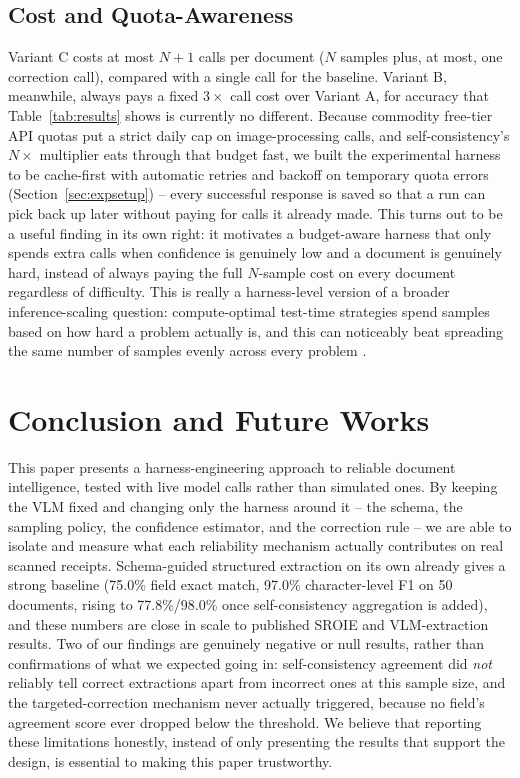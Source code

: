 \documentclass[conference]{IEEEtran}
\begin{document}
\subsection{Cost and Quota-Awareness}
Variant C costs at most \(N + 1\) calls per document (\(N\) samples plus, at most, one correction call), compared with a single call for the baseline. Variant B, meanwhile, always pays a fixed \(3\times\) call cost over Variant A, for accuracy that Table~\ref{tab:results} shows is currently no different. Because commodity free-tier API quotas put a strict daily cap on image-processing calls, and self-consistency's \(N\times\) multiplier eats through that budget fast, we built the experimental harness to be cache-first with automatic retries and backoff on temporary quota errors (Section~\ref{sec:expsetup}) -- every successful response is saved so that a run can pick back up later without paying for calls it already made. This turns out to be a useful finding in its own right: it motivates a budget-aware harness that only spends extra calls when confidence is genuinely low and a document is genuinely hard, instead of always paying the full \(N\)-sample cost on every document regardless of difficulty. This is really a harness-level version of a broader inference-scaling question: compute-optimal test-time strategies spend samples based on how hard a problem actually is, and this can noticeably beat spreading the same number of samples evenly across every problem \cite{b32}.

\section{Conclusion and Future Works}
\label{sec:conclusion}

This paper presents a harness-engineering approach to reliable document intelligence, tested with live model calls rather than simulated ones. By keeping the VLM fixed and changing only the harness around it -- the schema, the sampling policy, the confidence estimator, and the correction rule -- we are able to isolate and measure what each reliability mechanism actually contributes on real scanned receipts. Schema-guided structured extraction on its own already gives a strong baseline (75.0\% field exact match, 97.0\% character-level F1 on 50 documents, rising to 77.8\%/98.0\% once self-consistency aggregation is added), and these numbers are close in scale to published SROIE and VLM-extraction results. Two of our findings are genuinely negative or null results, rather than confirmations of what we expected going in: self-consistency agreement did \emph{not} reliably tell correct extractions apart from incorrect ones at this sample size, and the targeted-correction mechanism never actually triggered, because no field's agreement score ever dropped below the threshold. We believe that reporting these limitations honestly, instead of only presenting the results that support the design, is essential to making this paper trustworthy.
\end{document}
